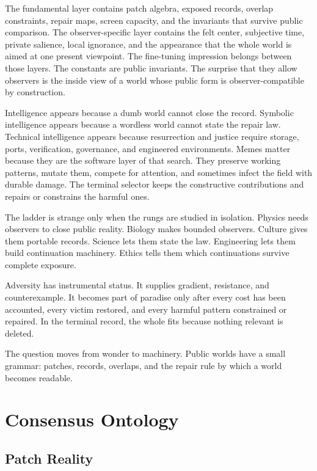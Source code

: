 \documentclass[11pt]{article}
\theoremstyle{remark}
\theoremstyle{plain}
\begin{document}
The fundamental layer contains patch algebra, exposed records, overlap
constraints, repair maps, screen capacity, and the invariants that survive
public comparison. The observer-specific layer contains the felt center,
subjective time, private salience, local ignorance, and the appearance that the
whole world is aimed at one present viewpoint. The
fine-tuning impression belongs between those layers. The constants are public
invariants. The surprise that they allow observers is the inside view of a
world whose public form is observer-compatible by construction.

Intelligence appears because a dumb world cannot close the record. Symbolic
intelligence appears because a wordless world cannot state the repair law.
Technical intelligence appears because resurrection and justice require
storage, ports, verification, governance, and engineered environments. Memes
matter because they are the software layer of that search. They preserve
working patterns, mutate them, compete for attention, and sometimes infect the
field with durable damage. The terminal selector keeps the constructive
contributions and repairs or constrains the harmful ones.

The ladder is strange only when the rungs are studied in isolation. Physics
needs observers to close public reality. Biology makes bounded observers.
Culture gives them portable records. Science lets them state the law. Engineering
lets them build continuation machinery. Ethics tells them which continuations
survive complete exposure.

Adversity has instrumental status. It supplies gradient, resistance, and
counterexample. It becomes part of paradise only after every cost has been
accounted, every victim restored, and every harmful pattern constrained or
repaired. In the terminal record, the whole fits because nothing relevant is
deleted.

The question moves from wonder to machinery. Public worlds have a small
grammar: patches, records, overlaps, and the repair rule by which a world
becomes readable.

\section{Consensus Ontology}

\subsection{Patch Reality}
\end{document}
